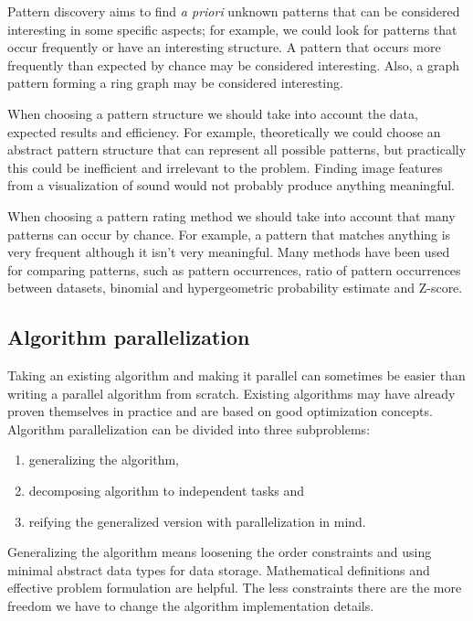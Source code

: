 Pattern discovery aims to find \emph{a priori} unknown patterns that can be considered interesting in some specific aspects; for example, we could look for patterns that occur frequently or have an interesting structure. A pattern that occurs more frequently than expected by chance may be considered interesting. Also, a graph pattern forming a ring graph may be considered interesting.

When choosing a pattern structure we should take into account the data, expected results and efficiency. For example, theoretically we could choose an abstract pattern structure that can represent all possible patterns, but practically this could be inefficient and irrelevant to the problem. Finding image features from a visualization of sound would not probably produce anything meaningful.

When choosing a pattern rating method we should take into account that many patterns can occur by chance. For example, a pattern that matches anything is very frequent although it isn't very meaningful. Many methods have been used for comparing patterns, such as pattern occurrences, ratio of pattern occurrences between datasets, binomial and hypergeometric probability estimate and Z-score.

\subsection{Algorithm parallelization}

Taking an existing algorithm and making it parallel can sometimes be easier than writing a parallel algorithm from scratch. Existing algorithms may have already proven themselves in practice and are based on good optimization concepts. Algorithm parallelization can be divided into three subproblems:

\begin{enumerate}
	\item generalizing the algorithm,
	\item decomposing algorithm to independent tasks and
	\item reifying the generalized version with parallelization in mind.
\end{enumerate}

Generalizing the algorithm means loosening the order constraints and using minimal abstract data types for data storage. Mathematical definitions and effective problem formulation are helpful. The less constraints there are the more freedom we have to change the algorithm implementation details.

